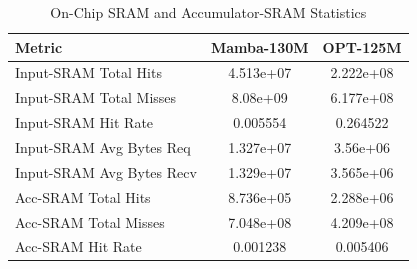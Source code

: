 \begin{table}[h]\centering
    \caption{On-Chip SRAM and Accumulator-SRAM Statistics}
    \label{tab:sram_detailed}
    \begin{tabular}{lcc}\hline
    Metric & Mamba-130M & OPT-125M \\\hline
        Input-SRAM Total Hits & 4.513e+07 & 2.222e+08 \\
    Input-SRAM Total Misses & 8.08e+09 & 6.177e+08 \\
    Input-SRAM Hit Rate & 0.005554 & 0.264522 \\
    Input-SRAM Avg Bytes Req & 1.327e+07 & 3.56e+06 \\
    Input-SRAM Avg Bytes Recv & 1.329e+07 & 3.565e+06 \\
    Acc-SRAM Total Hits & 8.736e+05 & 2.288e+06 \\
    Acc-SRAM Total Misses & 7.048e+08 & 4.209e+08 \\
    Acc-SRAM Hit Rate & 0.001238 & 0.005406 \\
\hline\end{tabular}\end{table}